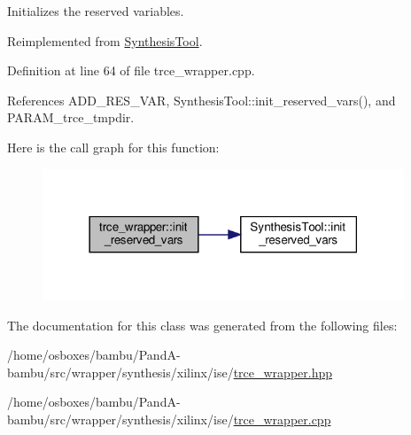 Initializes the reserved variables. 



Reimplemented from \hyperlink{classSynthesisTool_a85b4a4fa0cc60e5325a79d7479c505b7}{Synthesis\+Tool}.



Definition at line 64 of file trce\+\_\+wrapper.\+cpp.



References A\+D\+D\+\_\+\+R\+E\+S\+\_\+\+V\+AR, Synthesis\+Tool\+::init\+\_\+reserved\+\_\+vars(), and P\+A\+R\+A\+M\+\_\+trce\+\_\+tmpdir.

Here is the call graph for this function\+:
\nopagebreak
\begin{figure}[H]
\begin{center}
\leavevmode
\includegraphics[width=306pt]{dc/db5/classtrce__wrapper_a2b7b95bfdd4395bcd8bfedabafbb071b_cgraph}
\end{center}
\end{figure}


The documentation for this class was generated from the following files\+:\begin{DoxyCompactItemize}
\item 
/home/osboxes/bambu/\+Pand\+A-\/bambu/src/wrapper/synthesis/xilinx/ise/\hyperlink{trce__wrapper_8hpp}{trce\+\_\+wrapper.\+hpp}\item 
/home/osboxes/bambu/\+Pand\+A-\/bambu/src/wrapper/synthesis/xilinx/ise/\hyperlink{trce__wrapper_8cpp}{trce\+\_\+wrapper.\+cpp}\end{DoxyCompactItemize}
